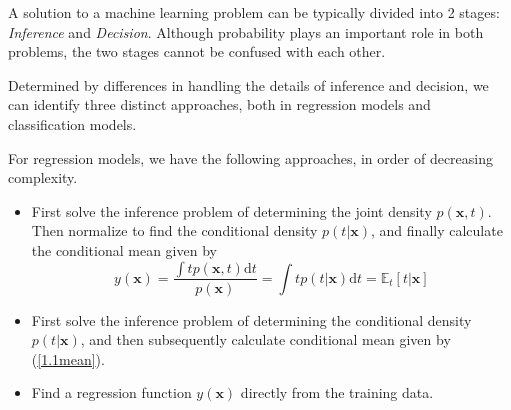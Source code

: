 \documentclass[a4paper]{book}
\newcommand{\ud}{\mathrm{d}}
\renewcommand{\bf}{\mathbf}
\newcommand{\bb}{\mathbb}
\newcommand{\imp}[1]{\textit{#1}}
\begin{document}
A solution to a machine learning problem can be typically divided into 2 stages: \imp{Inference} and \imp{Decision}. Although probability plays an important role in both problems, the two stages cannot be confused with each other. 

Determined by differences in handling the details of inference and decision, we can identify three distinct approaches, both in regression models and classification models. 

For regression models, we have the following approaches, in order of decreasing complexity.
\begin{itemize}
\item First solve the inference problem of determining the joint density $p(\bf{x},t)$. Then normalize to find the conditional density $p(t|\bf{x})$, and finally calculate the conditional mean given by 
\begin{equation}
	y(\bf{x})=\frac{\int tp(\bf{x},t)\ud t}{p(\bf{x})}=\int tp(t|\bf{x})\ud t = \bb{E}_t[t|\bf{x}] \label{1.1mean}
\end{equation}
\item First solve the inference problem of determining the conditional density $p(t|\bf{x})$, and then subsequently calculate conditional mean given by (\ref{1.1mean}).
\item Find a regression function $y(\bf{x})$ directly from the training data.
\end{itemize}
\end{document}
